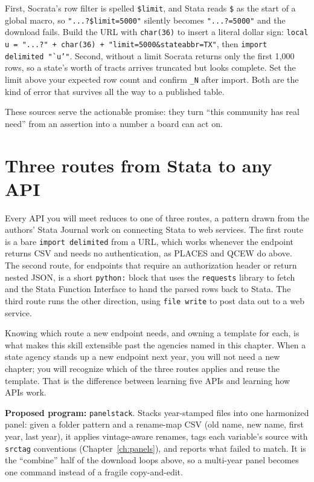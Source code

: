 \documentclass[
    a4paper,
    fontsize=10pt,
    twoside=true,
    numbers=noenddot,
]{kaobook}
\newenvironment{vizcallout}[1][Visualization to build]{%
    \begin{vizbox}[frametitle={#1}]%
}{%
    \end{vizbox}%
}
\begin{document}
\begin{vizcallout}[Two Socrata traps: the \$ collision and silent truncation]
First, Socrata's row filter is spelled \texttt{\$limit}, and Stata reads \texttt{\$} as the start of a global macro, so \texttt{"...?\$limit=5000"} silently becomes \texttt{"...?=5000"} and the download fails. Build the URL with \texttt{char(36)} to insert a literal dollar sign: \texttt{local u = "...?" + char(36) + "limit=5000\&stateabbr=TX"}, then \texttt{import delimited "`u'"}. Second, without a limit Socrata returns only the first 1{,}000 rows, so a state's worth of tracts arrives truncated but looks complete. Set the limit above your expected row count and confirm \texttt{\_N} after import. Both are the kind of error that survives all the way to a published table.
\end{vizcallout}

These sources serve the actionable promise: they turn \enquote{this community has real need} from an assertion into a number a board can act on.

\section{Three routes from Stata to any API}\label{sec:threeroutes}
Every API you will meet reduces to one of three routes, a pattern drawn from the authors' Stata Journal work on connecting Stata to web services. The first route is a bare \texttt{import delimited} from a URL, which works whenever the endpoint returns CSV and needs no authentication, as PLACES and QCEW do above. The second route, for endpoints that require an authorization header or return nested JSON, is a short \texttt{python:} block that uses the \texttt{requests} library to fetch and the Stata Function Interface to hand the parsed rows back to Stata. The third route runs the other direction, using \texttt{file write} to post data out to a web service.

Knowing which route a new endpoint needs, and owning a template for each, is what makes this skill extensible past the agencies named in this chapter. When a state agency stands up a new endpoint next year, you will not need a new chapter; you will recognize which of the three routes applies and reuse the template. That is the difference between learning five APIs and learning how APIs work.

\begin{kaobox}[frametitle=Ado-file Idea: \texttt{panelstack}]
\textbf{Proposed program:} \texttt{panelstack}. Stacks year-stamped files into one harmonized panel: given a folder pattern and a rename-map CSV (old name, new name, first year, last year), it applies vintage-aware renames, tags each variable's source with \texttt{srctag} conventions (Chapter~\ref{ch:panels}), and reports what failed to match. It is the \enquote{combine} half of the download loops above, so a multi-year panel becomes one command instead of a fragile copy-and-edit.
\end{kaobox}
\end{document}
